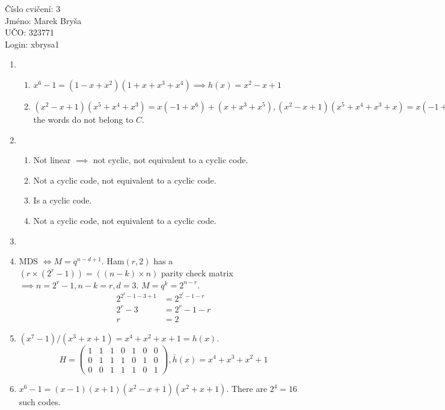 \documentclass[a4paper,10pt]{extarticle}
\begin{document}
\begin{flushleft}
Číslo cvičení: 3 \\ 
Jméno: Marek Bryša \\
UČO: 323771\\
Login: xbrysa1\\
\end{flushleft}
\begin{enumerate}
  \item
    \begin{enumerate}
      \item
        $x^6-1 = (1-x+x^2)(1+x+x^3+x^4)\implies h(x)=x^2-x+1$
      \item
        $(x^2-x+1)(x^5+x^4+x^3)=x(-1+x^6)+(x+x^3+x^5), (x^2-x+1)(x^5+x^4+x^3+x)=x(-1+x^6)+(2x-x^2+2x^3+x^5) \implies$ the words do not belong to $C$.
    \end{enumerate}
  \item
    \begin{enumerate}
      \item
        Not linear $\implies$ not cyclic, not equivalent to a cyclic code.
      \item
        Not a cyclic code, not equivalent to a cyclic code.
      \item
        Is a cyclic code.
      \item
        Not a cyclic code, not equivalent to a cyclic code.
    \end{enumerate}
  \item
  \item
    MDS $\iff M=q^{n-d+1}$. Ham$(r,2)$ has a $(r\times (2^r-1))=((n-k)\times n)$ parity check matrix $\implies n=2^r-1, n-k=r, d=3$. $M=q^k=2^{n-r}$.
    \begin{align}
      2^{2^r -1-3+1}&=2^{2^r -1-r}\nonumber\\
      2^r -3&=2^r-1-r\nonumber\\
      r&=2\nonumber
    \end{align}
  \item
    $(x^7-1)/(x^3+x+1)=x^4+x^2+x+1=h(x)$.\\
    \[
      H=
      \begin{pmatrix}
        1&1&1&0&1&0&0\\
        0&1&1&1&0&1&0\\
        0&0&1&1&1&0&1
      \end{pmatrix}
      , \bar{h}(x)=x^4+x^3+x^2+1
    \]
  \item
    $x^6-1=(x-1)(x+1)(x^2-x+1)(x^2+x+1)$. There are $2^4=16$ such codes.

\end{enumerate}
\end{document}
